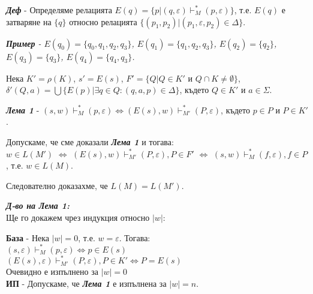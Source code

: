 \documentclass[fleqn,12pt]{article}
\begin{document}
\begin{flushleft}
\textit{\textbf{Деф}} - Определяме релацията $E(q) = \{p | (q, \varepsilon) \vdash_M^* (p, \varepsilon)\}$, т.е. $E(q)$ е затваряне на $\{q\}$ относно релацията $\{(p_1, p_2) | (p_1, \varepsilon, p_2) \in \Delta\}$.

\textit{\textbf{Пример} - $E(q_0) = \{q_0, q_1, q_2, q_3\}$, $E(q_1) = \{q_1, q_2, q_3\}$, $E(q_2) = \{q_2\}$, $E(q_3) = \{q_3\}$, $E(q_4) = \{q_4, q_3\}$.}


Нека $K' = \rho(K)$, $s' = E(s)$, $F' = \{Q | Q \in K' $ и $ Q \cap K \neq \emptyset \}$, $\delta'(Q, a) = \bigcup \{E(p) | \exists q \in Q: (q, a, p) \in \Delta\}$, където $Q \in K'$ и $a \in \Sigma$.

\textit{\textbf{Лема 1}} - $(s, w) \vdash_M^* (p, \varepsilon) \iff (E(s), w) \vdash_{M'}^* (P, \varepsilon)$, където $p \in P$ и $P \in K'$.

Допускаме, че сме доказали \textit{\textbf{Лема 1}} и тогава: \\

$w \in L(M')$ $\iff$ $(E(s), w) \vdash_{M'}^* (P, \varepsilon), P \in F'$ $\iff$ $(s, w) \vdash_M^* (f, \varepsilon), f \in P$, т.е. $w \in L(M)$.

Следователно доказахме, че $L(M) = L(M')$.

\textit{\textbf{Д-во  на Лема 1:}} \\

Ще го докажем чрез индукция относно $|w|$:

\textbf{База} - Нека $|w| = 0$, т.е. $w = \varepsilon$. Тогава: \\
$(s, \varepsilon) \vdash_M^* (p, \varepsilon) \iff p \in E(s)$ \\
$(E(s), \varepsilon) \vdash_{M'}^* (P, \varepsilon), P \in K' \iff P = E(s)$ \\
Очевидно е изпълнено за $|w| = 0$ \\

\textbf{ИП} - Допускаме, че \textit{\textbf{Лема 1}} е изпълнена за $|w| = n$. \\


\end{flushleft}
\end{document}
